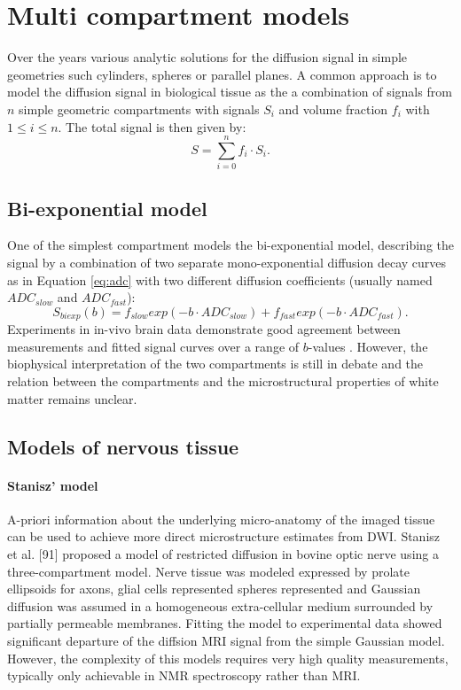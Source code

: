 \section{Multi compartment models}
Over the years various analytic solutions for the diffusion signal in simple geometries such cylinders, spheres or parallel planes\cite{TODO}. A common approach is to model the diffusion signal in biological tissue as the a combination of signals from $n$ simple geometric compartments with signals $S_i$ and volume fraction $f_i$ with $1 \le i \le n$. The total signal is then given by:
\begin{equation}
	S=\sum_{i=0}^{n}f_i\cdot S_i.
\end{equation}
\subsection*{Bi-exponential model}
One of the simplest compartment models the bi-exponential model, describing the signal by a combination of two separate mono-exponential diffusion decay curves as in Equation \ref{eq:adc} with two different diffusion coefficients (usually named $ADC_{slow}$ and $ADC_{fast}$):
\begin{equation}
	S_{biexp}(b) = f_{slow} exp(-b\cdot ADC_{slow}) + f_{fast} exp(-b\cdot ADC_{fast}).
\end{equation}
Experiments in in-vivo brain data demonstrate good agreement between measurements and fitted signal curves over a range of $b$-values \cite{clark02}. However, the biophysical interpretation of the two compartments is still in debate and the relation between the compartments and the microstructural properties of white matter remains unclear. 
\subsection*{Models of nervous tissue}
\paragraph*{Stanisz' model}
A-priori information about the underlying micro-anatomy of the imaged tissue can be used to achieve more direct microstructure estimates from DWI. Stanisz et al. [91] proposed a model of restricted diffusion in bovine optic nerve using a three-compartment model. Nerve tissue was modeled expressed by prolate ellipsoids for axons, glial cells represented spheres represented and Gaussian diffusion was assumed in a homogeneous extra-cellular medium surrounded by partially permeable membranes. Fitting the model to experimental data showed significant departure of the diffsion MRI signal from the simple Gaussian model. However, the complexity of this models requires very high quality measurements, typically only achievable in NMR spectroscopy rather than MRI.
